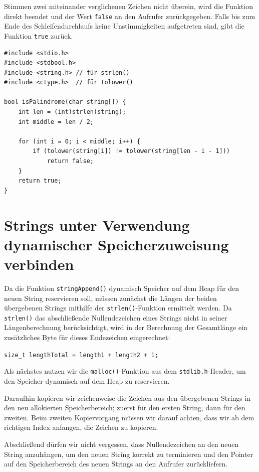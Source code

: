 Stimmen zwei miteinander verglichenen Zeichen nicht überein, wird die Funktion
direkt beendet und der Wert \texttt{false} an den Aufrufer zurückgegeben.
Falls bis zum Ende des Schleifendurchlaufs keine Unstimmigkeiten aufgetreten
sind, gibt die Funktion \texttt{true} zurück.

\begin{verbatim}
#include <stdio.h>
#include <stdbool.h>
#include <string.h> // für strlen()
#include <ctype.h>  // für tolower()

bool isPalindrome(char string[]) {
    int len = (int)strlen(string);
    int middle = len / 2;

    for (int i = 0; i < middle; i++) {
        if (tolower(string[i]) != tolower(string[len - i - 1]))
            return false;
    }
    return true;
}
\end{verbatim}



\chapter{Strings unter Verwendung dynamischer Speicherzuweisung verbinden}

Da die Funktion \texttt{stringAppend()} dynamisch Speicher auf dem Heap
für den neuen String reservieren soll, müssen zunächst die Längen der beiden
übergebenen Strings mithilfe der \texttt{strlen()}-Funktion ermittelt
werden. Da \texttt{strlen()} das abschließende Nullendezeichen eines
Strings nicht in seiner Längenberechnung berücksichtigt, wird in der Berechnung
der Gesamtlänge ein zusätzliches Byte für dieses Endezeichen eingerechnet:

\texttt{size_t lengthTotal = length1 + length2 + 1;}

Als nächstes nutzen wir die \texttt{malloc()}-Funktion aus dem
\texttt{stdlib.h}-Header, um den Speicher dynamisch auf dem Heap zu
reservieren.

Daraufhin kopieren wir zeichenweise die Zeichen aus den übergebenen Strings in
den neu allokierten Speicherbereich; zuerst für den ersten String, dann für den
zweiten. Beim zweiten Kopiervorgang müssen wir darauf achten, dass wir ab dem
richtigen Index anfangen, die Zeichen zu kopieren.

Abschließend dürfen wir nicht vergessen, dass Nullendezeichen an den neuen
String anzuhängen, um den neuen String korrekt zu terminieren und den Pointer
auf den Speicherbereich des neuen Strings an den Aufrufer zurückliefern.

